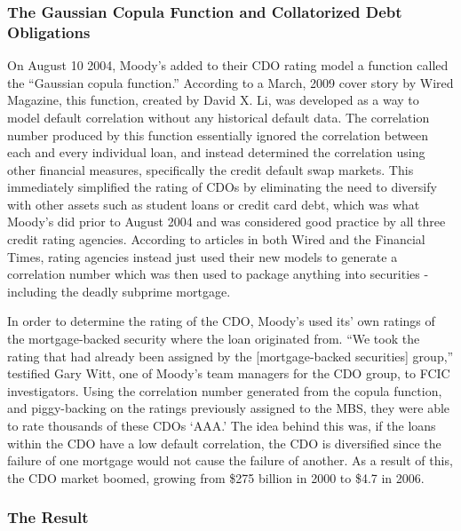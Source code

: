 \documentclass[11pt]{article}
\begin{document}
\begin{multicols}{2}
\subsubsection{The Gaussian Copula Function and Collatorized Debt Obligations}

On August 10 2004, Moody's added to their CDO rating model a function called the ``Gaussian copula function.'' \cite{ftGaussianCopula}  According to a March, 2009 cover story by Wired Magazine, this function, created by David X. Li, was developed as a way to model default correlation without any historical default data. \cite{wiredFormula}  The correlation number produced by this function essentially ignored the correlation between each and every individual loan, and instead determined the correlation using other financial measures, specifically the credit default swap markets. \cite{wiredFormula}  This immediately simplified the rating of CDOs by eliminating the need to diversify with other assets such as student loans or credit card debt, which was what Moody's did prior to August 2004 and was considered good practice by all three credit rating agencies. \cite{ftGaussianCopula}  According to articles in both Wired and the Financial Times, rating agencies instead just used their new models to generate a correlation number which was then used to package anything into securities - including the deadly subprime mortgage. \cite{ftGaussianCopula, wiredFormula}  

In order to determine the rating of the CDO, Moody's used its' own ratings of the mortgage-backed security where the loan originated from. ``We took the rating that had already been assigned by the [mortgage-backed securities] group,'' testified Gary Witt, one of Moody's team managers for the CDO group, to FCIC investigators. \cite[p.146-147]{govtReport}  Using the correlation number generated from the copula function, and piggy-backing on the ratings previously assigned to the MBS, they were able to rate thousands of these CDOs `AAA.' The idea behind this was, if the loans within the CDO have a low default correlation, the CDO is diversified since the failure of one mortgage would not cause the failure of another.  As a result of this, the CDO market boomed, growing from \$275 billion in 2000 to \$4.7 in 2006. \cite{wiredFormula}
 
\subsubsection{The Result}


\end{multicols}
\end{document}
